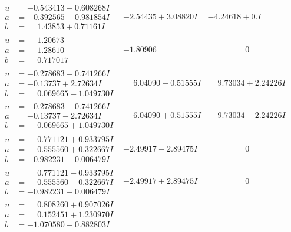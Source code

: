 \documentclass[1p]{elsarticle_modified}
\theoremstyle{definition}
\begin{document}
$$\begin{array}{c|c|c}
\begin{aligned}
u &= -0.543413 - 0.608268 I \\
a &= -0.392565 - 0.981854 I \\
b &= \phantom{-}1.43853 + 0.71161 I\end{aligned}
 & -2.54435 + 3.08820 I & -4.24618 + 0. I\phantom{ +0.000000I} \\ \hline\begin{aligned}
u &= \phantom{-}1.20673\phantom{ +0.000000I} \\
a &= \phantom{-}1.28610\phantom{ +0.000000I} \\
b &= \phantom{-}0.717017\phantom{ +0.000000I}\end{aligned}
 & -1.80906\phantom{ +0.000000I} & \phantom{-0.000000 } 0 \\ \hline\begin{aligned}
u &= -0.278683 + 0.741266 I \\
a &= -0.13737 + 2.72634 I \\
b &= \phantom{-}0.069665 - 1.049730 I\end{aligned}
 & \phantom{-}6.04090 - 0.51555 I & \phantom{-}9.73034 + 2.24226 I \\ \hline\begin{aligned}
u &= -0.278683 - 0.741266 I \\
a &= -0.13737 - 2.72634 I \\
b &= \phantom{-}0.069665 + 1.049730 I\end{aligned}
 & \phantom{-}6.04090 + 0.51555 I & \phantom{-}9.73034 - 2.24226 I \\ \hline\begin{aligned}
u &= \phantom{-}0.771121 + 0.933795 I \\
a &= \phantom{-}0.555560 + 0.322667 I \\
b &= -0.982231 + 0.006479 I\end{aligned}
 & -2.49917 - 2.89475 I & \phantom{-0.000000 } 0 \\ \hline\begin{aligned}
u &= \phantom{-}0.771121 - 0.933795 I \\
a &= \phantom{-}0.555560 - 0.322667 I \\
b &= -0.982231 - 0.006479 I\end{aligned}
 & -2.49917 + 2.89475 I & \phantom{-0.000000 } 0 \\ \hline\begin{aligned}
u &= \phantom{-}0.808260 + 0.907026 I \\
a &= \phantom{-}0.152451 + 1.230970 I \\
b &= -1.070580 - 0.882803 I\end{aligned}

\end{array}$$
\end{document}
